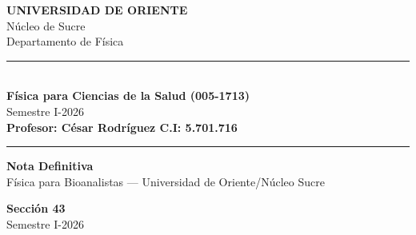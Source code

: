 \documentclass[12pt,letterpaper]{article}
\begin{document}
\begin{center}
  {\LARGE\bfseries\color{azulOscuro} UNIVERSIDAD DE ORIENTE}\\[2pt]
  {\large\color{azulOscuro} Núcleo de Sucre}\\[2pt]
  {\large\color{azulOscuro} Departamento de Física}\\[4pt]
  \rule{\linewidth}{1.5pt}\\[4pt]
  {\large\bfseries Física para Ciencias de la Salud (005-1713)}\\[2pt]
  {\normalsize Semestre I-2026}\\[2pt]
  {\normalsize\bfseries\color{grisMedio} Profesor: César Rodríguez \quad\textbullet\quad C.I: 5.701.716}\\[4pt]
  \rule{\linewidth}{0.6pt}
\end{center}

\vspace{8pt}

\begin{tcolorbox}[enhanced, colback=azulOscuro, colframe=azulOscuro,
  arc=4mm, boxrule=0pt, left=12pt, right=12pt, top=12pt, bottom=12pt]
  \begin{minipage}{0.68\linewidth}
    {\color{white}\sffamily\LARGE\bfseries Nota Definitiva}\\[2pt]
    {\color{white!80}\large Física para Bioanalistas --- Universidad de Oriente/Núcleo Sucre}
  \end{minipage}
  \hfill
  \begin{minipage}{0.28\linewidth}
    \raggedleft
    {\color{white}\large\bfseries Sección 43}\\
    {\color{white!80}\small Semestre I-2026}
  \end{minipage}
\end{tcolorbox}

\vspace{10pt}
\end{document}
